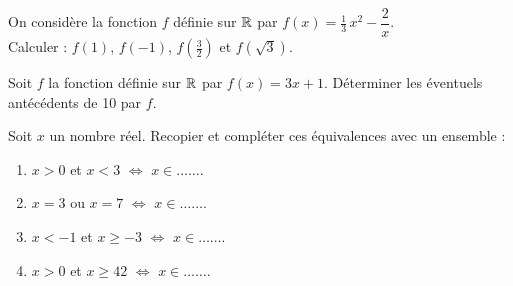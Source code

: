 \documentclass[a4paper,11pt,DIV15,BCOR0mm]{scrartcl}
\begin{document}
\begin{exercice}
On considère la fonction $f$ définie sur $\mathbb{R}$ par $f(x)= \frac{1}{3}\,x^2-\dfrac{2}{x}$.\\
Calculer :
$f(1)$, $f(-1)$, $f\left(\frac{3}{2}\right)$ et $f(\sqrt{3})$.

\end{exercice}

\begin{exercice}
Soit $f$ la fonction définie sur $\mathbb{R}$
par $f(x)=3x+1$.
Déterminer les éventuels antécédents de 10 par $f$. 
\end{exercice}

\begin{exercice}
Soit $x$ un nombre réel.
Recopier et compléter ces équivalences avec un ensemble :
\begin{enumerate}
\item $x>0$ et $x<3$ $\Leftrightarrow$ $x\in\ldots\ldots$.
\item $x=3$ ou $x=7$ $\Leftrightarrow$ $x\in\ldots\ldots$.
\item $x<-1$ et $x\geqslant-3$ $\Leftrightarrow$ $x\in\ldots\ldots$.
\item $x>0$ et $x\geqslant 42$ $\Leftrightarrow$ $x\in\ldots\ldots$.
\end{enumerate}
\end{exercice}
\end{document}
